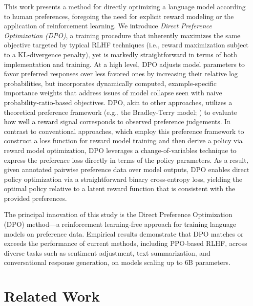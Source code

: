 This work presents a method for directly optimizing a language model according to human preferences, foregoing the need for explicit reward modeling or the application of reinforcement learning. We introduce \textit{Direct Preference Optimization (DPO)}, a training procedure that inherently maximizes the same objective targeted by typical RLHF techniques (i.e., reward maximization subject to a KL-divergence penalty), yet is markedly straightforward in terms of both implementation and training. At a high level, DPO adjusts model parameters to favor preferred responses over less favored ones by increasing their relative log probabilities, but incorporates dynamically computed, example-specific importance weights that address issues of model collapse seen with naive probability-ratio-based objectives. DPO, akin to other approaches, utilizes a theoretical preference framework (e.g., the Bradley-Terry model; \cite{bradley1952rankanalysis}) to evaluate how well a reward signal corresponds to observed preference judgements. In contrast to conventional approaches, which employ this preference framework to construct a loss function for reward model training and then derive a policy via reward model optimization, DPO leverages a change-of-variables technique to express the preference loss directly in terms of the policy parameters. As a result, given annotated pairwise preference data over model outputs, DPO enables direct policy optimization via a straightforward binary cross-entropy loss, yielding the optimal policy relative to a latent reward function that is consistent with the provided preferences.

The principal innovation of this study is the Direct Preference Optimization (DPO) method—a reinforcement learning-free approach for training language models on preference data. Empirical results demonstrate that DPO matches or exceeds the performance of current methods, including PPO-based RLHF, across diverse tasks such as sentiment adjustment, text summarization, and conversational response generation, on models scaling up to 6B parameters.

\section{Related Work}

